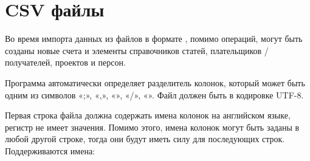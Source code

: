 \documentclass[a4paper,10pt,russian]{sphinxmanual}
\begin{document}
\section{CSV файлы}
\label{\detokenize{import:id3}}
Во время импорта данных из файлов в формате , помимо операций, могут быть созданы новые
счета и элементы справочников статей, плательщиков / получателей, проектов и персон.

Программа автоматически определяет разделитель колонок, который может быть одним из символов «;», «,», «\textbar{}», «/», «».
Файл должен быть в кодировке UTF-8.

Первая строка файла должна содержать имена колонок на английском языке, регистр не имеет значения. Помимо этого, имена
колонок могут быть заданы в любой другой строке, тогда они будут иметь силу для последующих строк. Поддерживаются имена:
\end{document}
